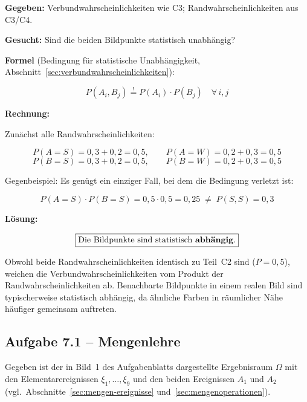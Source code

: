 \begin{beispiel}[Unabhängigkeitstest]

\textbf{Gegeben:} Verbundwahrscheinlichkeiten wie C3; Randwahrscheinlichkeiten aus C3/C4.

\textbf{Gesucht:} Sind die beiden Bildpunkte statistisch unabhängig?

\textbf{Formel} (Bedingung für statistische Unabhängigkeit,
Abschnitt~\ref{sec:verbundwahrscheinlichkeiten}):

$$
P(A_i, B_j) \stackrel{!}{=} P(A_i)\cdot P(B_j) \quad \forall\, i, j
$$

\textbf{Rechnung:}

Zunächst alle Randwahrscheinlichkeiten:

$$
P(A=S) = 0{,}3 + 0{,}2 = 0{,}5, \qquad P(A=W) = 0{,}2 + 0{,}3 = 0{,}5
$$
$$
P(B=S) = 0{,}3 + 0{,}2 = 0{,}5, \qquad P(B=W) = 0{,}2 + 0{,}3 = 0{,}5
$$

Gegenbeispiel: Es genügt ein einziger Fall, bei dem die Bedingung verletzt ist:

$$
P(A=S)\cdot P(B=S) = 0{,}5 \cdot 0{,}5 = 0{,}25 \;\neq\; P(S,S) = 0{,}3
$$

\textbf{Lösung:}

$$
\boxed{\text{Die Bildpunkte sind statistisch \textbf{abhängig}.}}
$$

Obwohl beide Randwahrscheinlichkeiten identisch zu Teil~C2 sind ($P = 0{,}5$), weichen
die Verbundwahrscheinlichkeiten vom Produkt der Randwahrscheinlichkeiten ab. Benachbarte
Bildpunkte in einem realen Bild sind typischerweise statistisch abhängig, da ähnliche
Farben in räumlicher Nähe häufiger gemeinsam auftreten.

\end{beispiel}

\subsection*{Aufgabe 7.1 – Mengenlehre}

Gegeben ist der in Bild~1 des Aufgabenblatts dargestellte Ergebnisraum $\Omega$ mit
den Elementarereignissen $\xi_1,\ldots,\xi_9$ und den beiden Ereignissen
$A_1$ und $A_2$ (vgl.\ Abschnitte~\ref{sec:mengen-ereignisse}
und~\ref{sec:mengenoperationen}).

